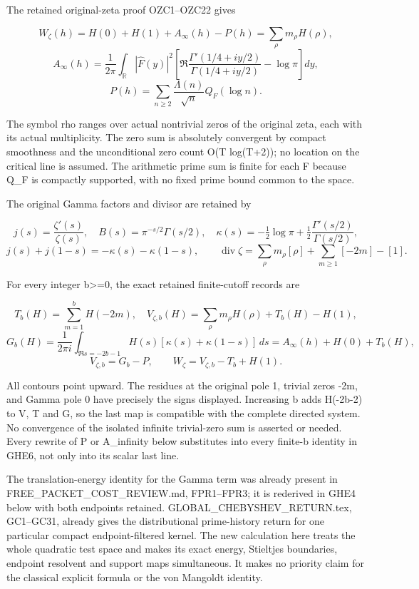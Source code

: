 The retained original-zeta proof OZC1--OZC22 gives

\[
W_\zeta(h)=H(0)+H(1)+A_\infty(h)-P(h)
=\sum_\rho m_\rho H(\rho),
\tag{GHE3}
\] \[
A_\infty(h)=\frac1{2\pi}\int_{\mathbb R}|\widehat F(y)|^2
\left[\Re\frac{\Gamma'(1/4+iy/2)}{\Gamma(1/4+iy/2)}-\log\pi\right]dy,
\] \[
P(h)=\sum_{n\ge2}\frac{\Lambda(n)}{\sqrt n}Q_F(\log n).
\tag{GHE4}
\]

The symbol rho ranges over actual nontrivial zeros of the original zeta,
each with its actual multiplicity. The zero sum is absolutely convergent
by compact smoothness and the unconditional zero count O(T log(T+2)); no
location on the critical line is assumed. The arithmetic prime sum is
finite for each F because Q\_F is compactly supported, with no fixed
prime bound common to the space.

The original Gamma factors and divisor are retained by

\[
j(s)=\frac{\zeta'(s)}{\zeta(s)},\quad
B(s)=\pi^{-s/2}\Gamma(s/2),\quad
\kappa(s)=-\tfrac12\log\pi+\tfrac12\frac{\Gamma'(s/2)}{\Gamma(s/2)},
\] \[
j(s)+j(1-s)=-\kappa(s)-\kappa(1-s),\qquad
\operatorname{div}\zeta=\sum_\rho m_\rho[\rho]+\sum_{m\ge1}[-2m]-[1].
\tag{GHE5}
\]

For every integer b\textgreater=0, the exact retained finite-cutoff
records are

\[
T_b(H)=\sum_{m=1}^b H(-2m),\quad
V_{\zeta,b}(H)=\sum_\rho m_\rho H(\rho)+T_b(H)-H(1),
\] \[
G_b(H)=\frac1{2\pi i}\int_{\Re s=-2b-1}
H(s)[\kappa(s)+\kappa(1-s)]\,ds
=A_\infty(h)+H(0)+T_b(H),
\] \[
V_{\zeta,b}=G_b-P,\qquad
W_\zeta=V_{\zeta,b}-T_b+H(1).
\tag{GHE6}
\]

All contours point upward. The residues at the original pole 1, trivial
zeros -2m, and Gamma pole 0 have precisely the signs displayed.
Increasing b adds H(-2b-2) to V, T and G, so the last map is compatible
with the complete directed system. No convergence of the isolated
infinite trivial-zero sum is asserted or needed. Every rewrite of P or
A\_infinity below substitutes into every finite-b identity in GHE6, not
only into its scalar last line.

The translation-energy identity for the Gamma term was already present
in FREE\_PACKET\_COST\_REVIEW.md, FPR1--FPR3; it is rederived in GHE4
below with both endpoints retained. GLOBAL\_CHEBYSHEV\_RETURN.tex,
GC1--GC31, already gives the distributional prime-history return for one
particular compact endpoint-filtered kernel. The new calculation here
treats the whole quadratic test space and makes its exact energy,
Stieltjes boundaries, endpoint resolvent and support maps simultaneous.
It makes no priority claim for the classical explicit formula or the von
Mangoldt identity.

